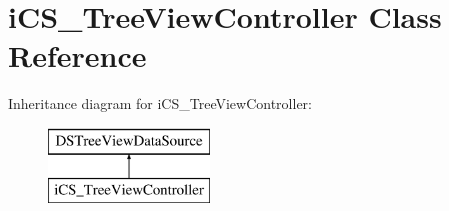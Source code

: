 \hypertarget{classi_c_s___tree_view_controller}{\section{i\+C\+S\+\_\+\+Tree\+View\+Controller Class Reference}
\label{classi_c_s___tree_view_controller}
}
Inheritance diagram for i\+C\+S\+\_\+\+Tree\+View\+Controller\+:\begin{figure}[H]
\begin{center}
\leavevmode
\includegraphics[height=2.000000cm]{classi_c_s___tree_view_controller}
\end{center}
\end{figure}

